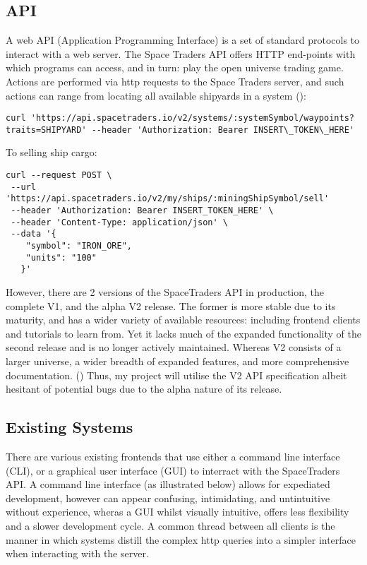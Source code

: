 \subsection{API}
A web API (Application Programming Interface) is a set of standard protocols to interact with a web server. The Space Traders API offers HTTP end-points with which programs can access, and in turn: play the open universe trading game. Actions are performed via http requests to the Space Traders server, and such actions can range from locating all available shipyards in a system (\textcite{spacetraders}):
\begin{lstlisting}
curl 'https://api.spacetraders.io/v2/systems/:systemSymbol/waypoints?traits=SHIPYARD' --header 'Authorization: Bearer INSERT\_TOKEN\_HERE'
\end{lstlisting}
To selling ship cargo:

\begin{lstlisting}
curl --request POST \
 --url 'https://api.spacetraders.io/v2/my/ships/:miningShipSymbol/sell'
 --header 'Authorization: Bearer INSERT_TOKEN_HERE' \
 --header 'Content-Type: application/json' \
 --data '{
    "symbol": "IRON_ORE",
    "units": "100"
   }'
\end{lstlisting}

However, there are 2 versions of the SpaceTraders API in production, the complete V1, and the alpha V2 release. The former is more stable due to its maturity, and has a wider variety of available resources: including frontend clients and tutorials to learn from. Yet it lacks much of the expanded functionality of the second release and is no longer actively maintained. Whereas V2 consists of a larger universe, a wider breadth of expanded features, and more comprehensive documentation. (\textcite{spacetraders}) Thus, my project will utilise the V2 API specification albeit hesitant of potential bugs due to the alpha nature of its release. 

\subsection{Existing Systems}
There are various existing frontends that use either a command line interface (CLI), or a graphical user interface (GUI) to interract with the SpaceTraders API. A command line interface (as illustrated below) allows for expediated development, however can appear confusing, intimidating, and untintuitive without experience, wheras a GUI whilst visually intuitive, offers less flexibility and a slower development cycle. A common thread between all clients is the manner in which systems distill the complex http queries into a simpler interface when interacting with the server.
\bigskip

